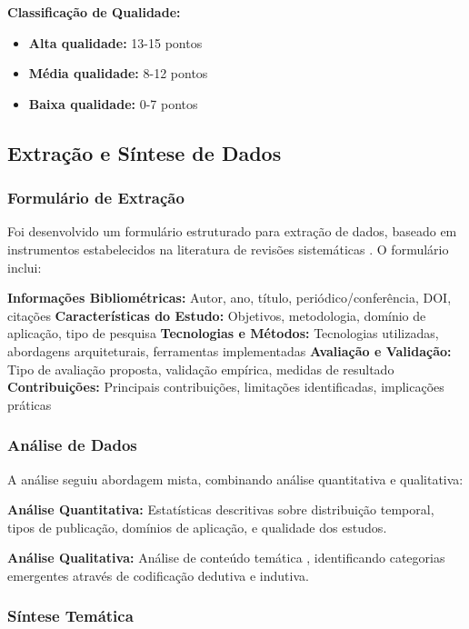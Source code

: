 \documentclass[english, spanish, brazilian]{RBIEarticle} %
\begin{document}
\textbf{Classificação de Qualidade:}
\begin{itemize}
\item \textbf{Alta qualidade:} 13-15 pontos
\item \textbf{Média qualidade:} 8-12 pontos
\item \textbf{Baixa qualidade:} 0-7 pontos
\end{itemize}

\subsection{Extração e Síntese de Dados}

\subsubsection{Formulário de Extração}

Foi desenvolvido um formulário estruturado para extração de dados, baseado em instrumentos estabelecidos na literatura de revisões sistemáticas \parencite{Kitchenham2007, Page2021}. O formulário inclui:

\textbf{Informações Bibliométricas:} Autor, ano, título, periódico/conferência, DOI, citações
\textbf{Características do Estudo:} Objetivos, metodologia, domínio de aplicação, tipo de pesquisa
\textbf{Tecnologias e Métodos:} Tecnologias utilizadas, abordagens arquiteturais, ferramentas implementadas
\textbf{Avaliação e Validação:} Tipo de avaliação proposta, validação empírica, medidas de resultado
\textbf{Contribuições:} Principais contribuições, limitações identificadas, implicações práticas

\subsubsection{Análise de Dados}

A análise seguiu abordagem mista, combinando análise quantitativa e qualitativa:

\textbf{Análise Quantitativa:} Estatísticas descritivas sobre distribuição temporal, tipos de publicação, domínios de aplicação, e qualidade dos estudos.

\textbf{Análise Qualitativa:} Análise de conteúdo temática \parencite{Braun2006}, identificando categorias emergentes através de codificação dedutiva e indutiva.

\subsubsection{Síntese Temática}
\end{document}

